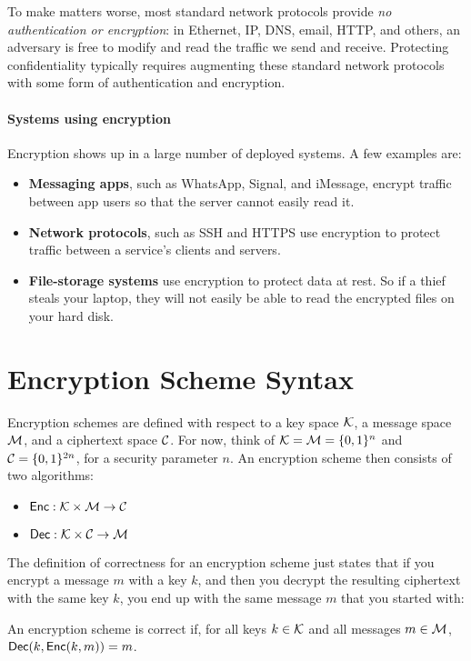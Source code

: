 To make matters worse, most standard network protocols provide \emph{no authentication or encryption}: in Ethernet, IP, DNS, 
email, HTTP, and others, an adversary is free to modify and read the traffic we send and receive. 
Protecting confidentiality typically requires augmenting these standard network
protocols with some form of authentication and encryption.

\paragraph{Systems using encryption}
Encryption shows up in a large number of deployed systems. A few examples are:
\begin{itemize}
  \item \textbf{Messaging apps}, such as WhatsApp, Signal, and iMessage, encrypt
        traffic between app users so that the server cannot easily read it.
  \item \textbf{Network protocols}, such as SSH and HTTPS use encryption to 
        protect traffic between a service's clients and servers.
  \item \textbf{File-storage systems} use encryption to protect data at rest.
        So if a thief steals your laptop, they will not easily be able to read
        the encrypted files on your hard disk.
\end{itemize}

\section{Encryption Scheme Syntax}
Encryption schemes are defined with respect to a key space $\mathcal{K}$, a message space $\mathcal{M}$, and a ciphertext space $\mathcal{C}$.
For now, think of $\mathcal{K} = \mathcal{M} = \{0,1\}^n$ and $\mathcal{C} = \{0,1\}^{2n}$,
for a security parameter $n$. 
An encryption scheme then consists of two algorithms:

\begin{itemize}
	\item $\mathsf{Enc}: \mathcal{K} \times \mathcal{M} \rightarrow \mathcal{C}$
	\item $\mathsf{Dec}: \mathcal{K} \times \mathcal{C} \rightarrow \mathcal{M}$
\end{itemize}

The definition of correctness for an encryption scheme just states
that if you encrypt a message $m$ with a key $k$, and then you decrypt
the resulting ciphertext with the same key $k$, you end up with the 
same message $m$ that you started with:
\begin{definition}
An encryption scheme is correct if, for all keys $k \in \mathcal{K}$ and all messages $m \in \mathcal{M}$, $\mathsf{Dec}(k, \mathsf{Enc}(k, m)) = m$.
\end{definition}

